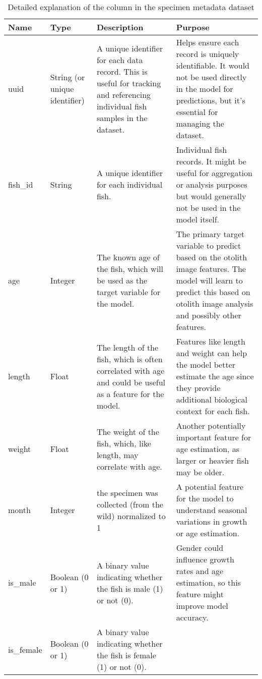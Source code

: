 \begin{longtable}{| p{} | p{} | p{} | p{} |}
    \caption{Detailed explanation of the column in the specimen metadata dataset}
    \label{tab:features} \\
    \hline
    Name &
    Type &
    Description &
    Purpose \\
    \hline
    \hline
    uuid &
    String (or unique identifier) & A unique identifier for each data record.
    This is useful for tracking and referencing individual fish samples in the dataset. &
    Helps ensure each record is uniquely identifiable.
    It would not be used directly in the model for predictions, but it's essential for managing the dataset.  \\
    \hline
    fish\_id &
    String &
    A unique identifier for each individual fish. &
    Individual fish records.
    It might be useful for aggregation or analysis purposes but would generally not be used in the model itself. \\
    \hline
    age &
    Integer & The known age of the fish, which will be used as the target variable for the model. &
    The primary target variable to predict based on the otolith image features.
    The model will learn to predict this based on otolith image analysis and possibly other features. \\
    \hline
    length &
    Float &
    The length of the fish, which is often correlated with age and could be useful as a feature for the model. &
    Features like length and weight can help the model better estimate the age since they provide additional biological context for each fish. \\
    \hline
    weight &
    Float &
    The weight of the fish, which, like length, may correlate with age. &
    Another potentially important feature for age estimation, as larger or heavier fish may be older. \\
    \hline
    month &
    Integer &
    the specimen was collected (from the wild) normalized to 1 &
    A potential feature for the model to understand seasonal variations in growth or age estimation. \\
    \hline
    is\_male &
    Boolean (0 or 1) &
    A binary value indicating whether the fish is male (1) or not (0). &
    Gender could influence growth rates and age estimation, so this feature might improve model accuracy. \\
    \hline
    is\_female &
    Boolean (0 or 1) &
    A binary value indicating whether the fish is female (1) or not (0). &

\end{longtable}
